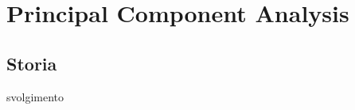 \setcounter{secnumdepth}{0}

\chapter{Principal Component Analysis}
	
	\section{Storia}
		svolgimento
